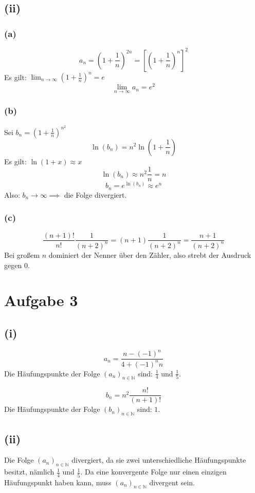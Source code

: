 \documentclass{article}
\begin{document}
\subsection*{(ii)}
\subsubsection*{(a)}
\[a_n = \left(1 + \frac{1}{n}\right)^{2n} = \left[ \left(1 + \frac{1}{n}\right)^n \right]^2\]
Es gilt: $\lim_{n\to\infty} \left(1+ \frac{1}{n}\right)^n = e$
\[\lim_{n\to\infty}a_n = e^2\]
\subsubsection*{(b)}
Sei $b_n = \left(1 + \frac{1}{n}\right)^{n^2}$
\[\ln(b_n) = n^2 \ln \left(1+\frac{1}{n}\right)\]
Es gilt: $\ln(1+x) \approx x$
\[\ln(b_n) \approx n^2 \frac{1}{n} = n\]
\[b_n = e^{\ln(b_n)} \approx e^n\]
Also: $b_n \to \infty \implies$ die Folge divergiert.
\subsubsection*{(c)}
\[\frac{(n+1)!}{n!} \frac{1}{(n+2)^n} = (n+1) \frac{1}{(n+2)^n} = \frac{n+1}{(n+2)^n}\]
Bei großem $n$ dominiert der Nenner über den Zähler, also strebt der Ausdruck gegen 0.

\section*{Aufgabe 3}

\subsection*{(i)}

    \[a_n = \frac{n - (-1)^n}{4 + (-1)^n n}\]
    Die Häufungspunkte der Folge \((a_n)_{n \in \mathbb{N}}\) sind: \(\frac{1}{4}\) und \(\frac{1}{5}\).

    \[b_n = n^2\frac{ n!}{(n+1)!}\]
    Die Häufungspunkte der Folge \((b_n)_{n \in \mathbb{N}}\) sind: \(1\).

\subsection*{(ii)}

Die Folge \((a_n)_{n \in \mathbb{N}}\) divergiert, da sie zwei unterschiedliche Häufungspunkte besitzt, nämlich \(\frac{1}{4}\) und \(\frac{1}{5}\). Da eine konvergente Folge nur einen einzigen Häufungspunkt haben kann, muss \((a_n)_{n \in \mathbb{N}}\) divergent sein.
\end{document}
